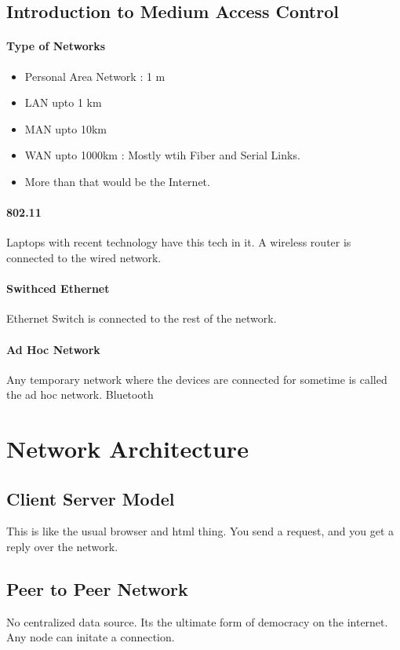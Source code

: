 \documentclass[11pt]{article}
\begin{document}
\begin{enumerate}
\section{Introduction to Medium Access Control}

\paragraph{Type of Networks}
\begin{itemize}
	\item Personal Area Network : 1 m
	\item LAN upto 1 km
	\item MAN upto 10km
	\item WAN upto 1000km : Mostly wtih Fiber and Serial Links. 
	\item More than that would be the Internet.
\end{itemize}
\end{enumerate}

\paragraph{802.11}
Laptops with recent technology have this tech in it. A wireless router is connected to the wired network. 

\paragraph{Swithced Ethernet}
Ethernet Switch is connected to the rest of the network. 

\paragraph*{Ad Hoc Network}
Any temporary network where the devices are connected for sometime is called the ad hoc network. Bluetooth

\section{Network Architecture}
\subsection{Client Server Model}
This is like the usual browser and html thing. You send a request, and you get a reply over the network. 
\subsection{Peer to Peer Network}
No centralized data source. Its the ultimate form of democracy on the internet. Any node can initate a connection. 
\end{document}

